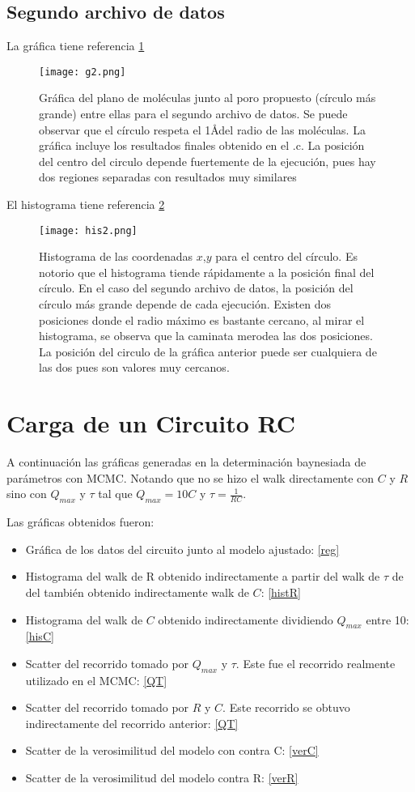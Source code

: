 ﻿\documentclass[notitlepage,letterpaper,12pt]{article}%
\begin{document}
\newpage

\subsection{Segundo archivo de datos}
La gráfica tiene referencia \ref{g1d2}

\begin{figure}[h]
  \centering
   \texttt{[image: g2.png]}
  \caption{Gráfica del plano de moléculas junto al poro propuesto (círculo más grande) entre ellas para el segundo archivo de datos. Se puede observar que el círculo respeta el 1\AA  del radio de las moléculas. La gráfica incluye los resultados finales obtenido en el .c. La posición del centro del circulo depende fuertemente de la ejecución, pues hay dos regiones separadas con resultados muy similares}
  \label{g1d2}
\end{figure}
\newpage
El histograma tiene referencia \ref{his2}
\begin{figure}[h!]
  \centering
   \texttt{[image: his2.png]}
  \caption{Histograma de las coordenadas $x$,$y$ para el centro del círculo. Es notorio que el histograma tiende rápidamente a la posición final del círculo. En el caso del segundo archivo de datos, la posición del círculo más grande depende de cada ejecución. Existen dos posiciones donde el radio máximo es bastante cercano, al mirar el histograma, se observa que la caminata merodea las dos posiciones. La posición del circulo de la gráfica anterior puede ser cualquiera de las dos pues son valores muy cercanos. }
  \label{his2}
\end{figure}

\newpage
\section{Carga de un Circuito RC}
A continuación las gráficas generadas en la determinación baynesiada de parámetros con MCMC.
Notando que no se hizo el walk directamente con $C$ y $R$ sino con $Q_{max}$ y $\tau$ tal que $Q_{max} = 10C$ y $\tau = \frac{1}{RC}$.

Las gráficas obtenidos fueron:
\begin{itemize}
\item Gráfica de los datos del circuito junto al modelo ajustado: \ref{reg}
\item Histograma del walk de R obtenido indirectamente a partir del walk de $\tau$ de del también obtenido indirectamente walk de $C$: \ref{histR}
\item Histograma del walk de $C$ obtenido indirectamente dividiendo $Q_{max}$ entre 10: \ref{hisC} 
\item Scatter del recorrido tomado por $Q_{max}$ y $\tau$. Este fue el recorrido realmente utilizado en el MCMC: \ref{QT}
\item Scatter del recorrido tomado por $R$ y $C$. Este recorrido se obtuvo indirectamente del recorrido anterior: \ref{QT}
\item Scatter de la verosimilitud del modelo con contra C: \ref{verC}
\item Scatter de la verosimilitud del modelo contra R: \ref{verR}
\end{itemize}
\end{document}
